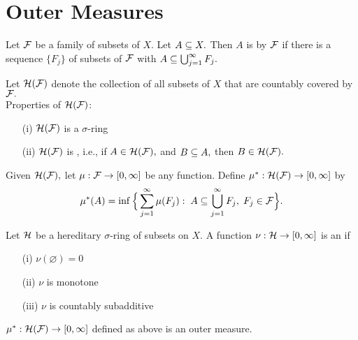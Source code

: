 \section{Outer Measures}
\begin{defn}
Let $\mathcal{F}$ be a family of subsets of $X.$ Let $A\subseteq X.$ Then $A$ is  by $\mathcal{F}$ if there is a sequence $\{F_j\}$ of subsets of $\mathcal{F}$ with $A\subseteq\bigcup_{j=1}^{\infty} F_j.$
\end{defn}

\noindent Let $\mathcal{H}(\mathcal{F})$ denote the collection of all subsets of $X$ that are countably covered by $\mathcal{F}.$ \\
Properties of $\mathcal{H}(\mathcal{F})$:
\begin{enumerate}
\item[(i)] $\mathcal{H}(\mathcal{F})$ is a $\sigma$-ring
\item[(ii)] $\mathcal{H}(\mathcal{F})$ is , i.e., if $A\in\mathcal{H}(\mathcal{F}),$ and $B\subseteq A,$ then $B\in\mathcal{H}(\mathcal{F}).$
\end{enumerate}

\noindent Given $\mathcal{H}(\mathcal{F}),$ let $\mu:\mathcal{F}\rightarrow[0,\infty]$ be any function. Define $\mu^*:\mathcal{H}(\mathcal{F})\rightarrow[0,\infty]$ by
$$\mu^*(A)=\inf\Big\{\sum_{j=1}^{\infty}\mu(F_j):\;A\subseteq\bigcup_{j=1}^{\infty} F_j,\; F_j\in\mathcal{F}\Big\}.$$

\begin{defn}
Let $\mathcal{H}$ be a hereditary $\sigma$-ring of subsets on $X.$ A function $\nu:\mathcal{H}\rightarrow[0,\infty]$ is an  if
\begin{enumerate}
\item[(i)] $\nu(\varnothing)=0$
\item[(ii)] $\nu$ is monotone
\item[(iii)] $\nu$ is countably subadditive
\end{enumerate}
\end{defn}

\begin{prop}
$\mu^*:\mathcal{H}(\mathcal{F})\rightarrow[0,\infty]$ defined as above is an outer measure. \\ \\
\end{prop}

